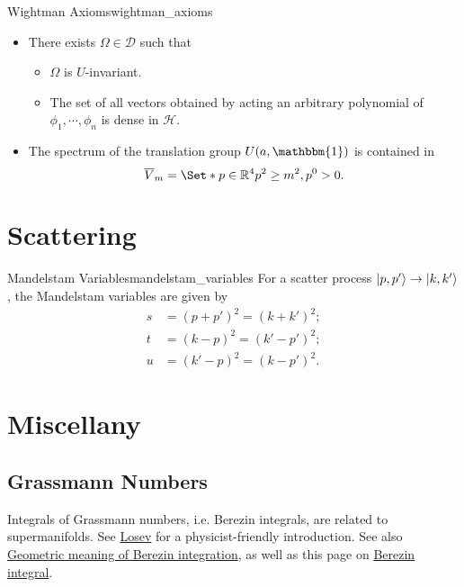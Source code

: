 \documentclass{article}
\begin{document}
\begin{definition}{Wightman Axioms}{wightman_axioms}
\begin{itemize}
        \item There exists $\Omega \in \mathcal{D}$ such that
        \begin{itemize}
            \item $\Omega$ is $U$-invariant.
            \item The set of all vectors obtained by acting an arbitrary polynomial of $\phi_1,\cdots,\phi_n$ is dense in $\mathcal{H}$.
        \end{itemize}
        \item The spectrum of the translation group $U(a,\mathbbm{1})$ is contained in
        \[ \overline{V}_m = \Set*{p\in \mathbb{R}^4}{p^2 \ge m^2, p^0 > 0}. \]
    \end{itemize}
\end{definition}

\section{Scattering}

\begin{definition}{Mandelstam Variables}{mandelstam_variables}
    For a scatter process $\ket{p,p'}\rightarrow \ket{k,k'}$, the Mandelstam variables are given by
    \begin{align*}
        s &= (p+p')^2 = (k+k')^2; \\
        t &= (k-p)^2 = (k'-p')^2; \\
        u &= (k'-p)^2 = (k-p')^2.
    \end{align*}
\end{definition}

\section{Miscellany}

\subsection{Grassmann Numbers}

Integrals of Grassmann numbers, i.e. Berezin integrals, are related to supermanifolds.
See \href{ref/Losev-Berezin-Integral.pdf}{Losev} for a physicist-friendly introduction.
See also \href{https://math.stackexchange.com/questions/1449312/geometric-meaning-of-berezin-integration}{Geometric meaning of Berezin integration},
as well as this page on \href{https://ncatlab.org/nlab/show/Berezin+integral}{Berezin integral}.



\end{document}
